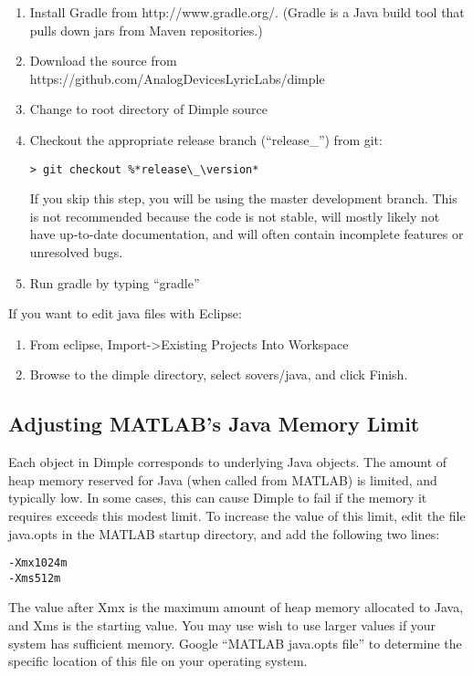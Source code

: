 \begin{enumerate}
\item Install Gradle from http://www.gradle.org/.  (Gradle is a Java build tool that pulls down jars from Maven repositories.)
\item Download the source from https://github.com/AnalogDevicesLyricLabs/dimple
\item Change to root directory of Dimple source
\item Checkout the appropriate release branch (``release\_\version'') from git:

\begin{lstlisting}
> git checkout %*release\_\version*
\end{lstlisting}

If you skip this step, you will be using the master development branch. This is not recommended because the code is not stable, will mostly likely not have up-to-date documentation, and will often contain incomplete features or unresolved bugs.

\item Run gradle by typing ``gradle''
\end{enumerate}

If you want to edit java files with Eclipse:

\begin{enumerate}
\item From eclipse, Import-\textgreater Existing Projects Into Workspace
\item Browse to the dimple directory, select sovers/java, and click Finish.
\end{enumerate}



\ifmatlab

\subsection{Adjusting MATLAB's Java Memory Limit}

Each object in Dimple corresponds to underlying Java objects. The amount of heap memory reserved for Java (when called from MATLAB) is limited, and typically low.  In some cases, this can cause Dimple to fail if the memory it requires exceeds this modest limit.  To increase the value of this limit, edit the file java.opts in the MATLAB startup directory, and add the following two lines:

\begin{lstlisting}
-Xmx1024m
-Xms512m
\end{lstlisting}

The value after Xmx is the maximum amount of heap memory allocated to Java, and Xms is the starting value.  You may use wish to use larger values if your system has sufficient memory.  Google ``MATLAB java.opts file'' to determine the specific location of this file on your operating system.

\fi


